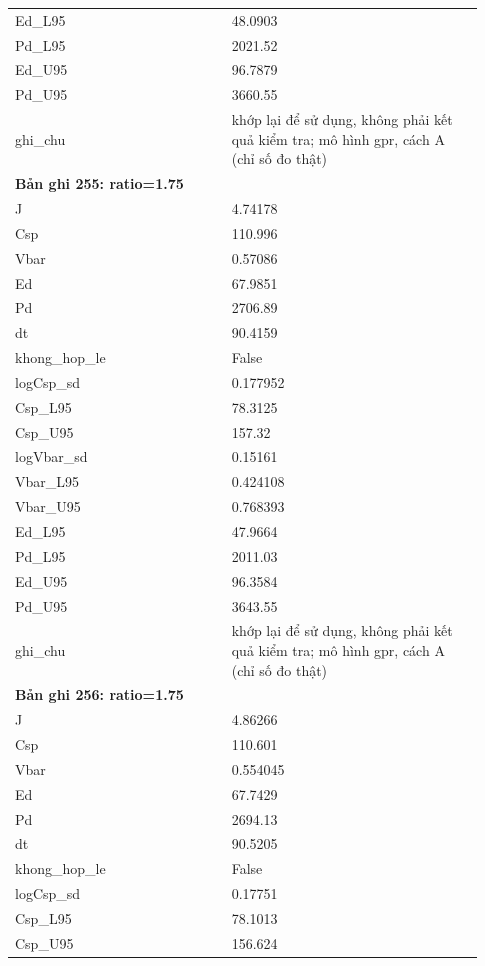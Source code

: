 \begin{longtable}{p{0.43\linewidth}p{0.50\linewidth}}
Ed\_\allowbreak L95 & 48.0903 \\
Pd\_\allowbreak L95 & 2021.52 \\
Ed\_\allowbreak U95 & 96.7879 \\
Pd\_\allowbreak U95 & 3660.55 \\
ghi\_\allowbreak chu & khớp lại để sử dụng, không phải kết quả kiểm tra; mô hình gpr, cách A (chỉ số đo thật) \\
\midrule
\multicolumn{2}{p{0.95\linewidth}}{\textbf{Bản ghi 255: ratio=1.75}} \\
J & 4.74178 \\
Csp & 110.996 \\
Vbar & 0.57086 \\
Ed & 67.9851 \\
Pd & 2706.89 \\
dt & 90.4159 \\
khong\_\allowbreak hop\_\allowbreak le & False \\
logCsp\_\allowbreak sd & 0.177952 \\
Csp\_\allowbreak L95 & 78.3125 \\
Csp\_\allowbreak U95 & 157.32 \\
logVbar\_\allowbreak sd & 0.15161 \\
Vbar\_\allowbreak L95 & 0.424108 \\
Vbar\_\allowbreak U95 & 0.768393 \\
Ed\_\allowbreak L95 & 47.9664 \\
Pd\_\allowbreak L95 & 2011.03 \\
Ed\_\allowbreak U95 & 96.3584 \\
Pd\_\allowbreak U95 & 3643.55 \\
ghi\_\allowbreak chu & khớp lại để sử dụng, không phải kết quả kiểm tra; mô hình gpr, cách A (chỉ số đo thật) \\
\midrule
\multicolumn{2}{p{0.95\linewidth}}{\textbf{Bản ghi 256: ratio=1.75}} \\
J & 4.86266 \\
Csp & 110.601 \\
Vbar & 0.554045 \\
Ed & 67.7429 \\
Pd & 2694.13 \\
dt & 90.5205 \\
khong\_\allowbreak hop\_\allowbreak le & False \\
logCsp\_\allowbreak sd & 0.17751 \\
Csp\_\allowbreak L95 & 78.1013 \\
Csp\_\allowbreak U95 & 156.624 \\

\end{longtable}
